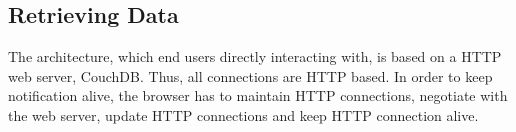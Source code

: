 \subsection{Retrieving Data}
The architecture, which end users directly interacting with, is based on a HTTP web server, CouchDB. Thus, all connections are HTTP based. In order to keep notification alive, the browser has to maintain HTTP connections, negotiate with the web server, update HTTP connections and keep HTTP connection alive. 


 